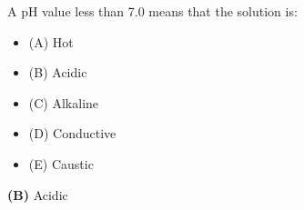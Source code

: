 

A pH value less than 7.0 means that the solution is:

\begin{itemize}
\item{(A)} Hot
\vskip 5pt 
\item{(B)} Acidic
\vskip 5pt 
\item{(C)} Alkaline
\vskip 5pt 
\item{(D)} Conductive
\vskip 5pt 
\item{(E)} Caustic
\end{itemize}







{\bf (B)} Acidic
 









